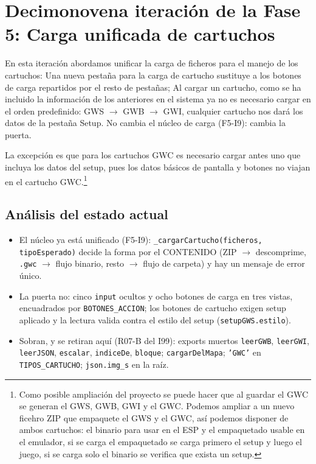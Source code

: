 \section{Decimonovena iteración de la Fase 5: Carga unificada de cartuchos}
\label{sec:F5I19}

En esta iteración abordamos unificar la carga de ficheros para el manejo de los cartuchos: Una nueva pestaña para la carga de cartucho sustituye a los botones de carga repartidos por el resto de  pestañas; Al cargar un cartucho, como se ha incluido la información de los anteriores en el sistema ya no es necesario cargar en el orden predefinido: GWS $\to$ GWB $\to$ GWI, cualquier cartucho nos dará los datos de la pestaña Setup. No cambia el núcleo de carga (F5-I9): cambia la puerta.

La excepción es que para los cartuchos GWC es necesario cargar antes uno que incluya los datos del setup, pues los datos básicos de pantalla y botones no viajan en el cartucho GWC.\footnote{Como posible ampliación del proyecto se puede hacer que al guardar el GWC se generan el GWS, GWB, GWI y el GWC. Podemos ampliar a un nuevo ficehro ZIP que empaquete el GWS y el GWC, así podemos disponer de ambos cartuchos: el binario para usar en el ESP y el empaquetado usable en el emulador, si se carga el empaquetado se carga primero el setup y luego el juego, si se carga solo el binario se verifica que exista un setup.}

\subsection{Análisis del estado actual}
\label{sec:F5I19Analisis}

\begin{itemize}
	\item El núcleo ya está unificado (F5-I9): \texttt{\_cargarCartucho(ficheros,
		tipoEsperado)} decide la forma por el CONTENIDO (ZIP $\to$ descomprime,
	\texttt{.gwc} $\to$ flujo binario, resto $\to$ flujo de carpeta) y hay un
	mensaje de error único.
	\item La puerta no: cinco \texttt{input} ocultos y ocho botones de carga
	en tres vistas, encuadrados por \texttt{BOTONES\_ACCION}; los botones de
	cartucho exigen setup aplicado y la lectura valida contra el estilo del
	setup (\texttt{setupGWS.estilo}).
	\item Sobran, y se retiran aquí (R07-B del I99): exports muertos
	\texttt{leerGWB}, \texttt{leerGWI}, \texttt{leerJSON}, \texttt{escalar},
	\texttt{indiceDe}, \texttt{bloque}; \texttt{cargarDelMapa};
	\texttt{'GWC'} en \texttt{TIPOS\_CARTUCHO}; \texttt{json.img\_s} en la
	raíz.
\end{itemize}

